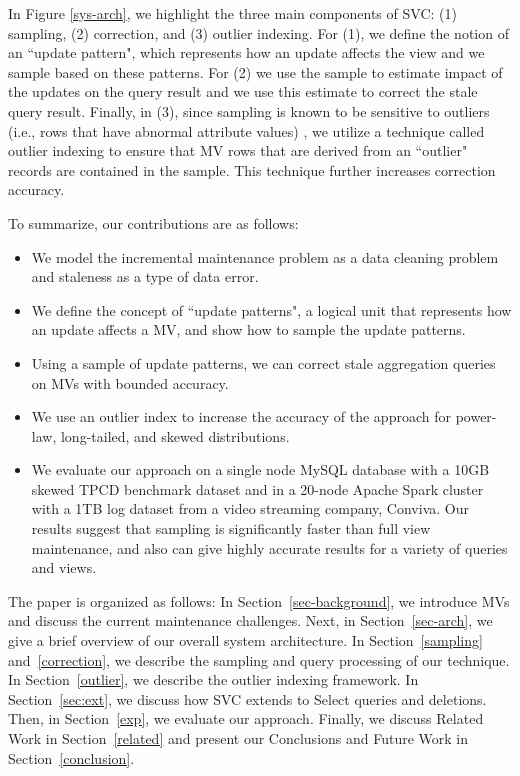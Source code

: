 In Figure \ref{sys-arch}, we highlight the three main components of SVC: (1) sampling, (2) correction, and (3) outlier indexing. For (1), we define the notion of an ``update pattern", which represents how an update affects the view and we sample based on these patterns. For (2) we use the sample to estimate impact of the updates on the query result and we use this estimate to correct the stale query result.
Finally, in (3), since sampling is known to be sensitive to outliers (i.e., rows that have abnormal attribute values) \cite{chaudhuri2001overcoming}, we
utilize a technique called outlier indexing \cite{chaudhuri2001overcoming} to ensure that MV rows that are derived from an ``outlier" records are contained in the sample.  This technique further increases correction accuracy.

To summarize, our contributions are as follows:
\begin{itemize}\vspace{-.45em}
\item We model the incremental maintenance problem as a data cleaning problem and staleness as a type of data error.\vspace{-.45em}
\item We define the concept of ``update patterns", a logical unit that represents how an update affects a MV, and show how to sample the update patterns. \vspace{-.45em}
\item Using a sample of update patterns, we can correct stale aggregation queries on MVs with bounded accuracy.\vspace{-.45em}
\item We use an outlier index to increase the accuracy of the approach for power-law, long-tailed, and skewed distributions.\vspace{-.45em}
\item We evaluate our approach on a single node MySQL database with a 10GB skewed TPCD benchmark dataset and in a 20-node Apache Spark cluster with a 1TB log dataset from a video streaming company, Conviva. Our results suggest that sampling is significantly faster than full view maintenance, and also can give highly accurate results for a variety of queries and views.\vspace{-.45em}
\end{itemize}

The paper is organized as follows: 
In Section~\ref{sec-background}, we introduce MVs and discuss the current maintenance challenges.
Next, in Section~\ref{sec-arch}, we give a brief overview of our overall system architecture.
In Section~\ref{sampling} and~\ref{correction}, we describe the sampling and query processing of our technique.
In Section~\ref{outlier}, we describe the outlier indexing framework.
In Section~\ref{sec:ext}, we discuss how SVC extends to Select queries and deletions.
Then, in Section~\ref{exp}, we evaluate our approach.
Finally, we discuss Related Work in Section~\ref{related} and present our Conclusions and Future Work in Section~\ref{conclusion}.
